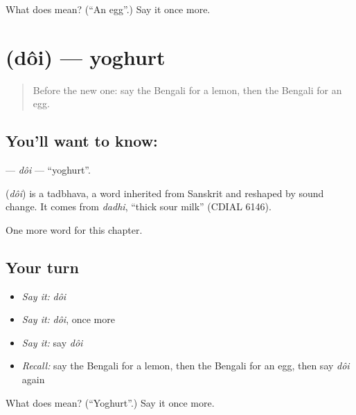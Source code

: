 \begin{tcolorbox}[breakable,colback=teal!4,colframe=teal!35!black,title={Before you move on}]
What does  mean? (\textquotedblleft{}An egg\textquotedblright{}.) Say it once more.
\end{tcolorbox}
\section[\texorpdfstring{\bn{দই} (dôi)}{দই (dôi)}]{ (dôi) — yoghurt}

\label{lesson:BN-C58-doi}



\begin{quote}
Before the new one: say the Bengali for a lemon, then the Bengali for an egg.
\end{quote}

\subsection*{You'll want to know: }
\textbf{} — \emph{dôi} — \textquotedblleft{}yoghurt\textquotedblright{}.

\begin{cousinweb}
\textbf{} (\emph{dôi}) is a tadbhava, a word inherited from Sanskrit and reshaped by sound change. It comes from \emph{dadhi}, \textquotedblleft{}thick sour milk\textquotedblright{} (CDIAL 6146).
\end{cousinweb}

\begin{grammarlens}[title={What you've built}]
One more word for this chapter.
\end{grammarlens}

\subsection*{Your turn}
\begin{itemize}
\raggedright
  \item \emph{Say it:} \emph{dôi}
  \item \emph{Say it:} \emph{dôi}, once more
  \item \emph{Say it:} say \emph{dôi}
  \item \emph{Recall:} say the Bengali for a lemon, then the Bengali for an egg, then say \emph{dôi} again
\end{itemize}

\begin{tcolorbox}[breakable,colback=teal!4,colframe=teal!35!black,title={Before you move on}]
What does  mean? (\textquotedblleft{}Yoghurt\textquotedblright{}.) Say it once more.
\end{tcolorbox}
